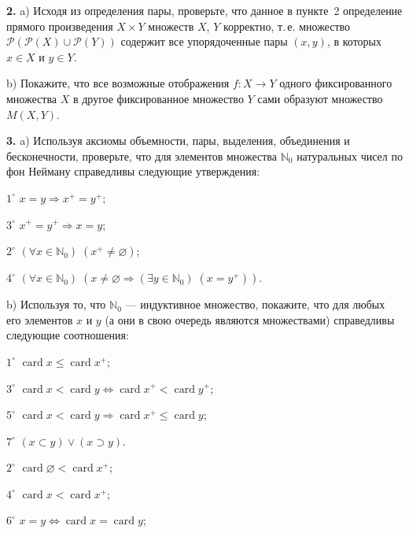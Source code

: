 \textbf{2.}\; a) Исходя из определения пары, проверьте, что данное в пункте~2 определение
прямого произведения $X \times Y$ множеств $X$, $Y$ корректно, т.\,е. множество
$\mathscr{P}(\mathscr{P}(X) \cup \mathscr{P}(Y))$ содержит все упорядоченные пары $(x, y)$, в которых $x \in X$ и $y \in Y$.

b) Покажите, что все возможные отображения $f \colon X \to Y$ одного фиксированного множества $X$ в другое фиксированное множество $Y$ сами образуют множество
$M(X, Y)$.

\textbf{3.}\; a) Используя аксиомы объемности, пары, выделения, объединения и
бесконечности, проверьте, что для элементов множества $\mathbb{N}_0$ натуральных чисел
по фон Нейману справедливы следующие утверждения:

\begin{minipage}[t]{0.45\linewidth}
  $1^\circ$ \; $x = y \Rightarrow x^+ = y^+$;

  $3^\circ$ \; $x^+ = y^+ \Rightarrow x = y$;
\end{minipage}
\hfill
\begin{minipage}[t]{0.45\linewidth}
  $2^\circ$ \; $(\forall x \in \mathbb{N}_0)\; (x^+ \neq \varnothing)$;

  $4^\circ$ \; $(\forall x \in \mathbb{N}_0)\; (x \neq \varnothing \Rightarrow (\exists y \in \mathbb{N}_0)\; (x = y^+))$.
\end{minipage}

\medskip

b) Используя то, что $\mathbb{N}_0$ --- индуктивное множество, покажите, что для любых его
элементов $x$ и $y$ (а они в свою очередь являются множествами) справедливы
следующие соотношения:

\begin{minipage}[t]{0.65\linewidth}
  $1^\circ$ \; $\operatorname{card} x \leqslant \operatorname{card} x^+$;

  $3^\circ$ \; $\operatorname{card} x < \operatorname{card} y \Leftrightarrow \operatorname{card} x^+ < \operatorname{card} y^+$;

  $5^\circ$ \; $\operatorname{card} x < \operatorname{card} y \Rightarrow \operatorname{card} x^+ \leqslant \operatorname{card} y$;

  $7^\circ$ \; $(x \subset y) \lor (x \supset y)$.
\end{minipage}
\hfill
\begin{minipage}[t]{0.35\linewidth}
  $2^\circ$ \; $\operatorname{card} \varnothing < \operatorname{card} x^+$;

  $4^\circ$ \; $\operatorname{card} x < \operatorname{card} x^+$;

  $6^\circ$ \; $x = y \Leftrightarrow \operatorname{card} x = \operatorname{card} y$;
\end{minipage}

